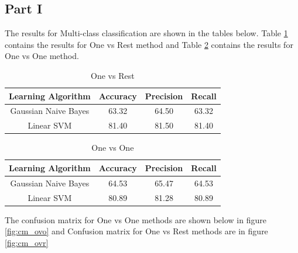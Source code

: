 \documentclass[11pt]{article}
\begin{document}
\subsection{Part I}

The results for Multi-class classification are shown in the tables below. Table \ref{table:ovr_res} contains the results for One vs Rest method and Table \ref{table:ovo_res} contains the results for One vs One method.

\begin{table}[h]
	\centering
	\begin{tabular}{|c|c|c|c|} \hline
		Learning Algorithm & Accuracy & Precision & Recall\\ \hline
		Gaussian Naive Bayes & 63.32 & 64.50 & 63.32 \\
		Linear SVM & 81.40 & 81.50 & 81.40 \\
		\hline
		\end{tabular}
		\caption{One vs Rest}
		\label{table:ovr_res}
\end{table}

\begin{table}[h]
	\centering
	\begin{tabular}{|c|c|c|c|} \hline
		Learning Algorithm & Accuracy & Precision & Recall\\ \hline
		Gaussian Naive Bayes & 64.53 & 65.47 & 64.53 \\
		Linear SVM & 80.89 & 81.28 & 80.89 \\
		\hline
	\end{tabular}
	\caption{One vs One}
	\label{table:ovo_res}
\end{table}

\newpage
The confusion matrix for One vs One methods are shown below in figure \ref{fig:cm_ovo} and Confusion matrix for One vs Rest methods are in figure \ref{fig:cm_ovr}
\end{document}
